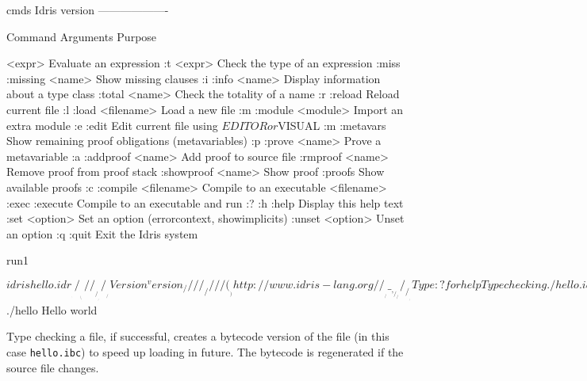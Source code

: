 \begin{SaveVerbatim}[commandchars=\\\{\}]{cmds}
Idris version \version{}
-------------------

   Command         Arguments   Purpose
                               
   <expr>                      Evaluate an expression
   :t              <expr>      Check the type of an expression
   :miss :missing  <name>      Show missing clauses
   :i :info        <name>      Display information about a type class
   :total          <name>      Check the totality of a name
   :r :reload                  Reload current file
   :l :load        <filename>  Load a new file
   :m :module      <module>    Import an extra module
   :e :edit                    Edit current file using $EDITOR or $VISUAL
   :m :metavars                Show remaining proof obligations (metavariables)
   :p :prove       <name>      Prove a metavariable
   :a :addproof    <name>      Add proof to source file
   :rmproof        <name>      Remove proof from proof stack
   :showproof      <name>      Show proof
   :proofs                     Show available proofs
   :c :compile     <filename>  Compile to an executable <filename>
   :exec :execute              Compile to an executable and run
   :? :h :help                 Display this help text
   :set            <option>    Set an option (errorcontext, showimplicits)
   :unset          <option>    Unset an option
   :q :quit                    Exit the Idris system
\end{SaveVerbatim}


\begin{SaveVerbatim}[commandchars=^\{\}]{run1}

$ idris hello.idr
     ____    __     _                                          
    /  _/___/ /____(_)____                                     
    / // __  / ___/ / ___/     Version ^version{}
  _/ // /_/ / /  / (__  )      http://www.idris-lang.org/      
 /___/\__,_/_/  /_/____/       Type :? for help        

Type checking ./hello.idr
*hello> :t main 
main : IO ()
*hello> :c hello 
*hello> :q 
Bye bye
$ ./hello 
Hello world

\end{SaveVerbatim}


\noindent
Type checking a file, if successful, creates a bytecode version of the file (in
this case \texttt{hello.ibc}) to speed up loading in future. The bytecode is
regenerated if the source file changes.

